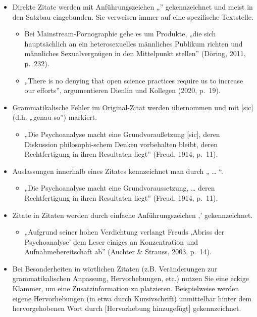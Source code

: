 \documentclass[
  letterpaper,
  DIV=11]{scrreprt}
\providecommand{\tightlist}{%
  \setlength{\itemsep}{0pt}\setlength{\parskip}{0pt}}\usepackage{longtable,booktabs,array}
\begin{document}
\begin{itemize}
\item
  Direkte Zitate werden mit Anführungszeichen „'' gekennzeichnet und
  meist in den Satzbau eingebunden. Sie verweisen immer auf eine
  spezifische Textstelle.

  \begin{itemize}
  \item
    Bei Mainstream-Pornographie gehe es um Produkte, „die sich
    hauptsächlich an ein heterosexuelles männliches Publikum richten und
    männliches Sexualvergnügen in den Mittelpunkt stellen'' (Döring,
    2011, p.~232).
  \item
    „There is no denying that open science practices require us to
    increase our efforts'', argumentieren Dienlin und Kollegen (2020,
    p.~19).
  \end{itemize}
\item
  Grammatikalische Fehler im Original-Zitat werden übernommen und mit
  {[}sic{]} (d.h. „genau so'') markiert.

  \begin{itemize}
  \tightlist
  \item
    „Die Psychoanalyse macht eine Grundvoraußetzung {[}sic{]}, deren
    Diskussion philosophi-schem Denken vorbehalten bleibt, deren
    Rechtfertigung in ihren Resultaten liegt'' (Freud, 1914, p.~11).
  \end{itemize}
\item
  Auslassungen innerhalb eines Zitates kennzeichnet man durch „ \ldots{}
  ``.

  \begin{itemize}
  \tightlist
  \item
    „Die Psychoanalyse macht eine Grundvoraussetzung, \ldots{} deren
    Rechtfertigung in ihren Resultaten liegt'' (Freud, 1914, p.~11).
  \end{itemize}
\item
  Zitate in Zitaten werden durch einfache Anführungszeichen ‚'
  gekennzeichnet.

  \begin{itemize}
  \tightlist
  \item
    „Aufgrund seiner hohen Verdichtung verlangt Freuds ‚Abriss der
    Psychoanalyse' dem Leser einiges an Konzentration und
    Aufnahmebereitschaft ab'' (Auchter \& Strauss, 2003, p.~14).
  \end{itemize}
\item
  Bei Besonderheiten in wörtlichen Zitaten (z.B. Veränderungen zur
  grammatikalischen Anpassung, Hervorhebungen, etc.) nutzen Sie eine
  eckige Klammer, um eine Zusatzinformation zu platzieren. Beispielweise
  werden eigene Hervorhebungen (in etwa durch Kursivschrift) unmittelbar
  hinter dem hervorgehobenen Wort durch {[}Hervorhebung hinzugefügt{]}
  gekennzeichnet.


\end{itemize}
\end{document}
